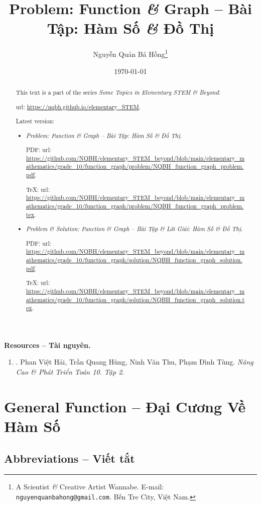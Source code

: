 \documentclass{article}
\title{Problem: Function {\it\&} Graph  -- Bài Tập: Hàm Số {\it\&} Đồ Thị}
\author{Nguyễn Quản Bá Hồng\footnote{A Scientist {\it\&} Creative Artist Wannabe. E-mail: {\tt nguyenquanbahong@gmail.com}. Bến Tre City, Việt Nam.}}
\date{\today}
\begin{document}
\maketitle
\begin{abstract}
	This text is a part of the series {\it Some Topics in Elementary STEM \& Beyond}:
	
	{\sc url}: \url{https://nqbh.github.io/elementary_STEM}.
	
	Latest version:
	\begin{itemize}
		\item {\it Problem: Function \& Graph  -- Bài Tập: Hàm Số \& Đồ Thị}.
		
		PDF: {\sc url}: \url{https://github.com/NQBH/elementary_STEM_beyond/blob/main/elementary_mathematics/grade_10/function_graph/problem/NQBH_function_graph_problem.pdf}.
		
		\TeX: {\sc url}: \url{https://github.com/NQBH/elementary_STEM_beyond/blob/main/elementary_mathematics/grade_10/function_graph/problem/NQBH_function_graph_problem.tex}.
		\item {\it Problem \& Solution: Function \& Graph  -- Bài Tập \& Lời Giải: Hàm Số \& Đồ Thị}.
		
		PDF: {\sc url}: \url{https://github.com/NQBH/elementary_STEM_beyond/blob/main/elementary_mathematics/grade_10/function_graph/solution/NQBH_function_graph_solution.pdf}.
		
		\TeX: {\sc url}: \url{https://github.com/NQBH/elementary_STEM_beyond/blob/main/elementary_mathematics/grade_10/function_graph/solution/NQBH_function_graph_solution.tex}.
	\end{itemize}
\end{abstract}
\tableofcontents


\textbf{\textsf{Resources -- Tài nguyên.}}
\begin{enumerate}
	\item \cite{Hai_Hung_Thu_Tung_ncpt_Toan_10_tap_2}. {\sc Phan Việt Hải, Trần Quang Hùng, Ninh Văn Thu, Phạm Đình Tùng}. {\it Nâng Cao \& Phát Triển Toán 10. Tập 2}.
\end{enumerate}

\section{General Function -- Đại Cương Về Hàm Số}

\subsection*{Abbreviations -- Viết tắt}
\end{document}
